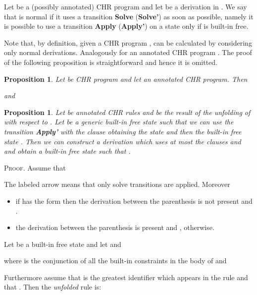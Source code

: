 \documentclass[final]{acmtrans2e}
\newtheorem{proposition}[theorem]{Proposition}
\begin{document}
\begin{definition}\label{def:ND}
Let   be a (possibly annotated) CHR program  and let
 be a derivation in .
We say that  is normal if it uses a transition
\textbf{Solve} (\textbf{Solve'}) as soon as possible, namely it is possible to use a transition
\textbf{Apply} (\textbf{Apply'})
on a state  only if  is built-in free.
\end{definition}


Note that, by definition, given a CHR program ,  can be calculated by
considering only normal derivations. Analogously for an annotated CHR program .
The proof  of the following proposition is straightforward and hence it is omitted.

\begin{proposition}\label{prop:solonorm}
Let  be CHR program  and let  an annotated CHR program.
Then

and

\end{proposition}

\begin{proposition}\label{prop:servequality}
Let  be annotated CHR rules and   be the result
of the unfolding of  with respect to . Let  be a generic built-in free state such that we can use the transition \textbf{Apply'} with the clause  obtaining the state  and then the built-in free state . Then we can construct a derivation which uses at most the clauses  and  and obtain a built-in free state  such that .
\end{proposition}


\textsc{Proof.}
Assume that


The labeled arrow  means that only solve transitions are applied.
Moreover
\begin{itemize}
           \item if  has the form
 then the derivation between the parenthesis is not present and .
           \item the derivation between the parenthesis is present and , otherwise.
         \end{itemize}



Let   be a built-in free state
and let
 and

where  is the conjunction of all the built-in constraints in the body
of  and

Furthermore assume that  is the greatest identifier which appears in the
rule  and that .
Then the \emph{unfolded} rule is:
\end{document}
